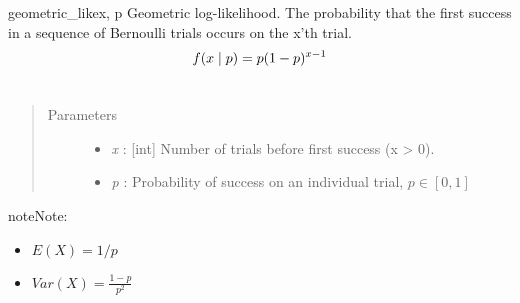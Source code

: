 \hypertarget{pymc.distributions.geometric_like}{}\begin{funcdesc}{geometric\_like}{x, p}
Geometric log-likelihood. The probability that the first success in a
sequence of Bernoulli trials occurs on the x'th trial.
\begin{gather}
\begin{split}f(x \mid p) = p(1-p)^{x-1}\end{split}\notag\\\begin{split}\end{split}\notag
\end{gather}\begin{quote}\begin{description}
\item[Parameters] \leavevmode\begin{itemize}
\item {} 
\emph{x} : {[}int{]} Number of trials before first success (x \textgreater{} 0).

\item {} 
\emph{p} : Probability of success on an individual trial, $p \in [0,1]$

\end{itemize}

\end{description}\end{quote}

\begin{notice}{note}{Note:}\begin{itemize}
\item {} 
$E(X)=1/p$

\item {} 
$Var(X)=\frac{1-p}{p^2}$

\end{itemize}
\end{notice}
\end{funcdesc}


